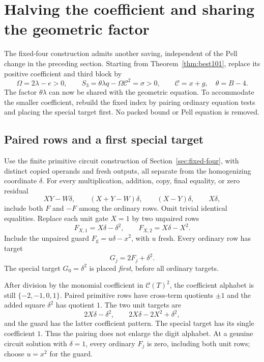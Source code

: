\section{Halving the coefficient and sharing the geometric factor}
\label{sec:half-center}

The fixed-four construction admits another saving, independent of the
Pell change in the preceding section. Starting from
Theorem~\ref{thm:best101}, replace its positive coefficient and third
block by
\begin{equation}\label{eq:half-center-block}
 \Omega=2\lambda-e>0,\qquad
 S_3=\theta\lambda q-\Omega\mathcal C^2=\sigma>0,
 \qquad \mathcal C=x+g,\quad\theta=B-4.
\end{equation}
The factor $\theta\lambda$ can now be shared with the geometric
equation. To accommodate the smaller coefficient, rebuild the fixed
index by pairing ordinary equation tests and placing the special
target first. No packed bound or Pell equation is removed.

\subsection{Paired rows and a first special target}

Use the finite primitive circuit construction of
Section~\ref{sec:fixed-four}, with distinct copied operands and fresh
outputs, all separate from the homogenizing coordinate $\delta$.
For every multiplication, addition, copy, final equality, or zero
residual
\[
 XY-W\delta,\qquad (X+Y-W)\delta,\qquad
 (X-Y)\delta,\qquad X\delta,
\]
include both $F$ and $-F$ among the ordinary rows. Omit trivial
identical equalities. Replace each unit gate $X=1$ by two unpaired
rows
\begin{equation}\label{eq:half-center-unit}
 F_{X,1}=X\delta-\delta^2,\qquad
 F_{X,2}=X\delta-X^2.
\end{equation}
Include the unpaired guard $F_{\mathrm g}=u\delta-x^2$, with $u$
fresh. Every ordinary row has target
\begin{equation}\label{eq:half-center-target}
 G_j=2F_j+\delta^2.
\end{equation}
The special target $G_0=\delta^2$ is placed \emph{first}, before all
ordinary targets.

After division by the monomial coefficient in $\mathcal C(T)^2$,
the coefficient alphabet is still $\{-2,-1,0,1\}$. Paired primitive
rows have cross-term quotients $\pm1$ and the added square
$\delta^2$ has quotient $1$. The two unit targets are
\[
 2X\delta-\delta^2,\qquad
 2X\delta-2X^2+\delta^2,
\]
and the guard has the latter coefficient pattern. The special
target has its single coefficient $1$. Thus the pairing does not
enlarge the digit alphabet. At a genuine circuit solution with
$\delta=1$, every ordinary $F_j$ is zero, including both unit rows;
choose $u=x^2$ for the guard.

